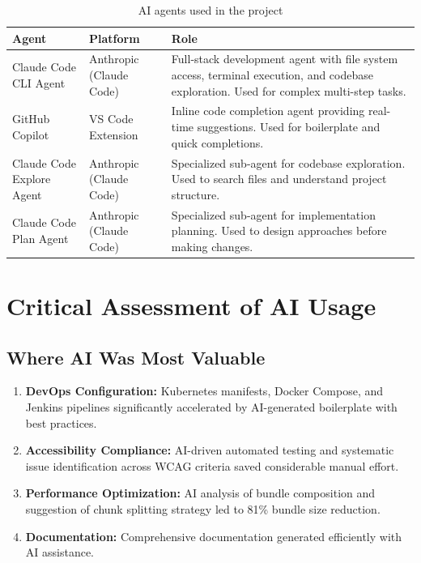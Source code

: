\documentclass[12pt,a4paper]{article}
\begin{document}
\begin{table}[H]
\centering
\begin{tabularx}{\textwidth}{llX}
\toprule
\textbf{Agent} & \textbf{Platform} & \textbf{Role} \\
\midrule
Claude Code CLI Agent    & Anthropic (Claude Code) & Full-stack development agent with file system access, terminal execution, and codebase exploration. Used for complex multi-step tasks. \\[0.8em]
GitHub Copilot           & VS Code Extension & Inline code completion agent providing real-time suggestions. Used for boilerplate and quick completions. \\[0.8em]
Claude Code Explore Agent& Anthropic (Claude Code) & Specialized sub-agent for codebase exploration. Used to search files and understand project structure. \\[0.8em]
Claude Code Plan Agent   & Anthropic (Claude Code) & Specialized sub-agent for implementation planning. Used to design approaches before making changes. \\
\bottomrule
\end{tabularx}
\caption{AI agents used in the project}
\end{table}

\section{Critical Assessment of AI Usage}

\subsection{Where AI Was Most Valuable}

\begin{enumerate}[noitemsep]
    \item \textbf{DevOps Configuration:} Kubernetes manifests, Docker Compose, and Jenkins pipelines significantly accelerated by AI-generated boilerplate with best practices.
    \item \textbf{Accessibility Compliance:} AI-driven automated testing and systematic issue identification across WCAG criteria saved considerable manual effort.
    \item \textbf{Performance Optimization:} AI analysis of bundle composition and suggestion of chunk splitting strategy led to 81\% bundle size reduction.
    \item \textbf{Documentation:} Comprehensive documentation generated efficiently with AI assistance.
\end{enumerate}
\end{document}
